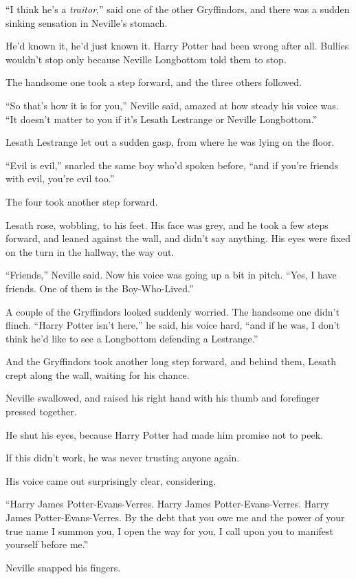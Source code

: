 “I think he’s a \emph{traitor},” said one of the other Gryffindors, and there
was a sudden sinking sensation in Neville’s stomach.

He’d known it, he’d just known it. Harry Potter had been wrong after all.
Bullies wouldn’t stop only because Neville Longbottom told them to stop.

The handsome one took a step forward, and the three others followed.

“So that’s how it is for you,” Neville said, amazed at how steady his voice
was. “It doesn’t matter to you if it’s Lesath Lestrange or Neville Longbottom.”

Lesath Lestrange let out a sudden gasp, from where he was lying on the floor.

“Evil is evil,” snarled the same boy who’d spoken before, “and if you’re
friends with evil, you’re evil too.”

The four took another step forward.

Lesath rose, wobbling, to his feet. His face was grey, and he took a few steps
forward, and leaned against the wall, and didn’t say anything. His eyes were
fixed on the turn in the hallway, the way out.

“Friends,” Neville said. Now his voice was going up a bit in pitch. “Yes, I
have friends. One of them is the Boy-Who-Lived.”

A couple of the Gryffindors looked suddenly worried. The handsome one didn’t
flinch. “Harry Potter isn’t here,” he said, his voice hard, “and if he was, I
don’t think he’d like to see a Longbottom defending a Lestrange.”

And the Gryffindors took another long step forward, and behind them, Lesath
crept along the wall, waiting for his chance.

Neville swallowed, and raised his right hand with his thumb and forefinger
pressed together.

He shut his eyes, because Harry Potter had made him promise not to peek.

If this didn’t work, he was never trusting anyone again.

His voice came out surprisingly clear, considering.

“Harry James Potter-Evans-Verres. Harry James Potter-Evans-Verres. Harry James
Potter-Evans-Verres. By the debt that you owe me and the power of your true
name I summon you, I open the way for you, I call upon you to manifest yourself
before me.”

Neville snapped his fingers.

